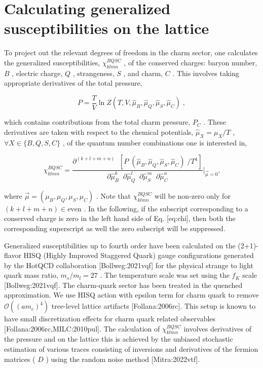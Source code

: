 \documentclass[11pt,a4paper]{article}
\begin{document}
\section{Calculating generalized susceptibilities on the lattice}

To project out the relevant degrees of freedom in the charm sector, one calculates the generalized susceptibilities,  ${\chi^{BQSC}_{klmn}}$ , of the conserved charges: baryon number,  $B$ , electric charge,  $Q$ , strangeness,  $S$ , and charm,  $C$ . This involves taking appropriate derivatives of the total pressure,

$$\begin{equation}
    P=\frac{T}{V}\ln Z(T,V,\hat{\mu}_B,\hat{\mu}_Q,\hat{\mu}_S,\hat{\mu}_C)
    \; ,

\end{equation}$$

which contains contributions from the total charm pressure,  $P_C$ . These derivatives are taken with respect to the chemical potentials,  ${\hat{\mu}_X = \mu_X/T}$ ,  ${\forall X \in \{B, Q, S, C\}}$ , of the quantum number combinations one is interested in,

$$\begin{equation} 
	{\chi^{BQSC}_{klmn}=\dfrac{\partial^{(k+l+m+n)}\;\;[P\;(\hat{\mu}_B,\hat{\mu}_Q,\hat{\mu}_S,\hat{\mu}_C)\;/T^4]}{\partial\hat{\mu}^{k}_B\;\;\partial\hat{\mu}^{l}_Q\;\;\partial\hat{\mu}^{m}_S\;\;\partial\hat{\mu}^{n}_C}}\bigg|_{\overrightarrow{\mu}=0}\text{,}
	
\end{equation}$$

where  $\vec{\mu}=(\mu_B, \mu_Q, \mu_S, \mu_C)$ . Note that  ${\chi^{BQSC}_{klmn}}$  will be non-zero only for  ${(k+l+m+n) \in \text{even}}$ . In the following, if the subscript corresponding to a conserved charge is zero in the left hand side of Eq. [eq:chi], then both the corresponding superscript as well the zero subscript will be suppressed.

Generalized susceptibilities up to fourth order have been calculated on the (2+1)-flavor HISQ (Highly Improved Staggered Quark) gauge configurations generated by the HotQCD collaboration [Bollweg:2021vqf] for the physical strange to light quark mass ratio,  ${m_s/m_{l}}=27$ . The temperature scale was set using the  $f_K$  scale [Bollweg:2021vqf]. The charm-quark sector has been treated in the quenched approximation. We use HISQ action with epsilon term for charm quark to remove  $\mathcal{O}((am_c)^4)$  tree-level lattice artifacts [Follana:2006rc]. This setup is known to have small discretization effects for charm quark related observables [Follana:2006rc,MILC:2010pul]. The calculation of  $\chi^{BQSC}_{klmn}$  involves derivatives of the pressure and on the lattice this is achieved by the unbiased stochastic estimation of various traces  consisting of inversions and derivatives  of the fermion matrices ( $D$ )  using the random noise method [Mitra:2022vtf].
\end{document}
